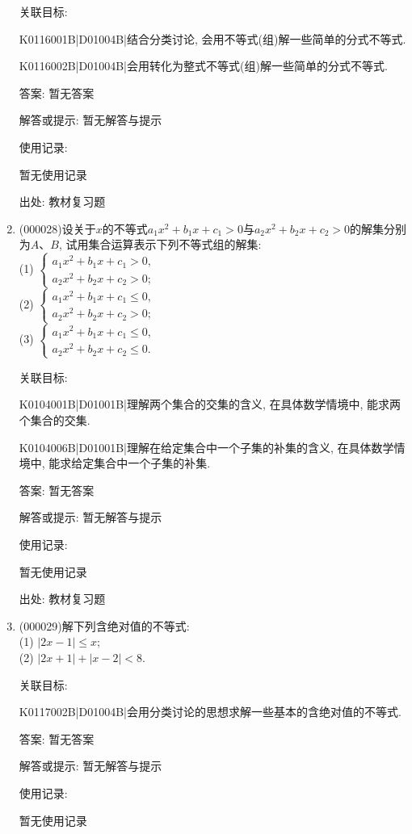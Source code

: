 \documentclass[10pt,a4paper]{article}
\begin{document}
\begin{enumerate}[1.]
关联目标:

K0116001B|D01004B|结合分类讨论, 会用不等式(组)解一些简单的分式不等式.

K0116002B|D01004B|会用转化为整式不等式(组)解一些简单的分式不等式.

答案: 暂无答案

解答或提示: 暂无解答与提示

使用记录:

暂无使用记录


出处: 教材复习题
\item { (000028)}设关于$x$的不等式$a_1x^2+b_1x+c_1>0$与$a_2x^2+b_2x+c_2>0$的解集分别为$A$、$B$,
试用集合运算表示下列不等式组的解集:\\
(1) $\begin{cases} a_1x^2+b_1x+c_1>0, \\ a_2x^2+b_2x+c_2>0;\end{cases}$\\
(2) $\begin{cases} a_1x^2+b_1x+c_1\le 0, \\ a_2x^2+b_2x+c_2>0;\end{cases}$\\
(3) $\begin{cases} a_1x^2+b_1x+c_1\le 0, \\ a_2x^2+b_2x+c_2\le 0.\end{cases}$


关联目标:

K0104001B|D01001B|理解两个集合的交集的含义, 在具体数学情境中, 能求两个集合的交集.

K0104006B|D01001B|理解在给定集合中一个子集的补集的含义, 在具体数学情境中, 能求给定集合中一个子集的补集.

答案: 暂无答案

解答或提示: 暂无解答与提示

使用记录:

暂无使用记录


出处: 教材复习题
\item { (000029)}解下列含绝对值的不等式:\\
(1) $|2x-1|\le x$;\\
(2) $|2x+1|+|x-2|<8$.


关联目标:

K0117002B|D01004B|会用分类讨论的思想求解一些基本的含绝对值的不等式.

答案: 暂无答案

解答或提示: 暂无解答与提示

使用记录:

暂无使用记录



\end{enumerate}
\end{document}

